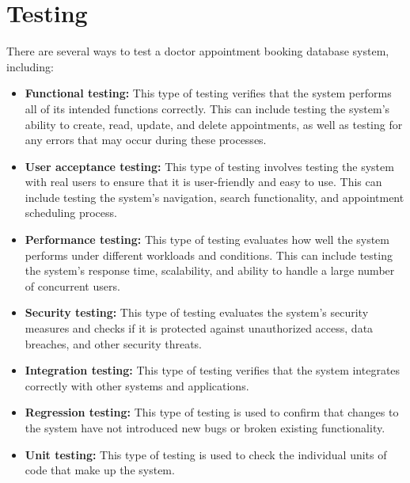 \chapter{Testing}
There are several ways to test a doctor appointment booking database system, including:

\begin{itemize}
    \item \textbf{Functional testing:} This type of testing verifies that the system performs all of its intended functions correctly. This can include testing the system's ability to create, read, update, and delete appointments, as well as testing for any errors that may occur during these processes.
    
    \item \textbf{User acceptance testing:} This type of testing involves testing the system with real users to ensure that it is user-friendly and easy to use. This can include testing the system's navigation, search functionality, and appointment scheduling process.
    
    \item \textbf{Performance testing:} This type of testing evaluates how well the system performs under different workloads and conditions. This can include testing the system's response time, scalability, and ability to handle a large number of concurrent users.

    \item \textbf{Security testing:} This type of testing evaluates the system's security measures and checks if it is protected against unauthorized access, data breaches, and other security threats.

    \item \textbf{Integration testing:} This type of testing verifies that the system integrates correctly with other systems and applications.

    \item \textbf{Regression testing:} This type of testing is used to confirm that changes to the system have not introduced new bugs or broken existing functionality.

    \item \textbf{Unit testing:} This type of testing is used to check the individual units of code that make up the system.
\end{itemize}









